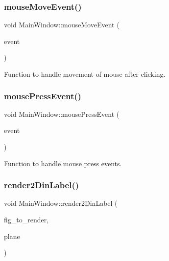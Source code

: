 \subsubsection{\texorpdfstring{mouse\+Move\+Event()}{mouseMoveEvent()}}
{\footnotesize\ttfamily void Main\+Window\+::mouse\+Move\+Event (\begin{DoxyParamCaption}\item[{Q\+Mouse\+Event $\ast$}]{event }\end{DoxyParamCaption})\hspace{0.3cm}{\ttfamily [override]}}



Function to handle movement of mouse after clicking. 

\mbox{\label{classMainWindow_a1dff511c9697cbcb60150894f480b9c8}} 
\subsubsection{\texorpdfstring{mouse\+Press\+Event()}{mousePressEvent()}}
{\footnotesize\ttfamily void Main\+Window\+::mouse\+Press\+Event (\begin{DoxyParamCaption}\item[{Q\+Mouse\+Event $\ast$}]{event }\end{DoxyParamCaption})\hspace{0.3cm}{\ttfamily [override]}}



Function to handle mouse press events. 

\mbox{\label{classMainWindow_abfa616ee6054f649786c044555289380}} 
\subsubsection{\texorpdfstring{render2\+Din\+Label()}{render2DinLabel()}}
{\footnotesize\ttfamily void Main\+Window\+::render2\+Din\+Label (\begin{DoxyParamCaption}\item[{\hyperlink{classFig3D}{Fig3D} \&}]{fig\+\_\+to\+\_\+render,  }\item[{unsigned int}]{plane }\end{DoxyParamCaption})}



